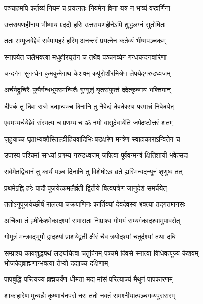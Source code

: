 \twolineshloka
{पञ्चाहमपि कर्तव्यं नियमं च प्रयत्नतः}
{नियमेन विना यत्र न भाव्यं वरवर्णिना} %

\twolineshloka
{उत्तरायणहीनाय भीष्माय प्रददौ हरिः}
{उत्तरायणहीनेऽपि शुद्धलग्नं सुतोषितः} %

\twolineshloka
{ततः सम्पूजयेद्देवं सर्वपापहरं हरिम्}
{अनन्तरं प्रयत्नेन कर्तव्यं भीष्मपञ्चकम्} %

\twolineshloka
{स्नापयेत जलैर्भक्त्या मधुक्षीरघृतेन च}
{तथैव पञ्चगव्येन गन्धचन्दनवारिणा} %

\twolineshloka
{चन्दनेन सुगन्धेन कुमकुमेनाथ केशवम्}
{कर्पूरोशीरमिश्रेण लेपयेद्गरुडध्वजम्} %

\twolineshloka
{अर्चयेद्रुचिरैः पुष्पैर्गन्धधूपसमन्वितैः}
{गुग्गुलुं घृतसंयुक्तं ददेत्कृष्णाय भक्तिमान्} %

\twolineshloka
{दीपकं तु दिवा रात्रौ दद्यात्पञ्च दिनानि तु}
{नैवेद्यं देवदेवस्य परमान्नं निवेदयेत्} %

\twolineshloka
{एवमभ्यर्चयेद्देवं संस्मृत्य च प्रणम्य च}
{ॐ नमो वासुदेवायेति जपेदष्टोत्तरं शतम्} %

\twolineshloka
{जुहुयाच्च घृताभ्यक्तैस्तिलव्रीहियवादिभिः}
{षडक्षरेण मन्त्रेण स्वाहाकाराऽन्वितेन च} %

\twolineshloka
{उपास्य पश्चिमां सन्ध्यां प्रणम्य गरुडध्वजम्}
{जपित्वा पूर्ववन्मन्त्रं क्षितिशायी भवेत्सदा} %

\twolineshloka
{सर्वमेतद्विधानं तु कार्यं पञ्च दिनानि तु}
{विशेषोऽत्र व्रते ह्यस्मिन्यदन्यूनं शृणुष्व तत्} %

\twolineshloka
{प्रथमेऽह्नि हरेः पादौ पूजयेत्कमलैर्व्रती}
{द्वितीये बिल्वपत्रेण जानुदेशं समर्चयेत्} %

\twolineshloka
{ततोऽनुपूजयेच्छीर्षं मालत्या चक्रपाणिनः}
{कार्तिक्यां देवदेवस्य भक्त्या तद्गतमानसः} %

\twolineshloka
{अर्चित्वा तं हृषीकेशमेकादश्यां समासतः}
{निःप्राश्य गोमयं सम्यगेकादश्यामुपावसेत्} %

\twolineshloka
{गोमूत्रं मन्त्रवद्भूमौ द्वादश्यां प्राशयेद्व्रती}
{क्षीरं चैव त्रयोदश्यां चतुर्दश्यां तथा दधि} %

\threelineshloka
{सम्प्राश्य कायशुद्ध्यर्थं लङ्घयित्वा चतुर्दिनम्}
{पञ्चमे दिवसे स्नात्वा विधिवत्पूज्य केशवम्}
{भोजयेद्ब्राह्मणान्भक्त्या तेभ्यो दद्याच्च दक्षिणाम्} %

\twolineshloka
{पापबुद्धिं परित्यज्य ब्रह्मचर्येण धीमता}
{मद्यं मांसं परित्याज्यं मैथुनं पापकारणम्} %

\twolineshloka
{शाकाहारेण मुन्यन्नैः कृष्णार्चनपरो नरः}
{ततो नक्तं समश्नीयात्पञ्चगव्यपुरःसरम्} %


